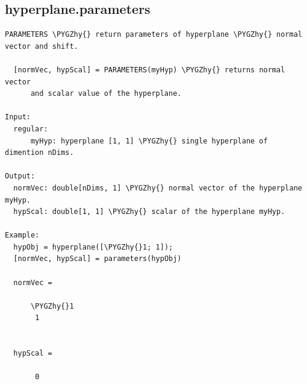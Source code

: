 \documentclass[letterpaper,10pt,english]{sphinxmanual}
\def\PYGZhy{\char`\-}
\begin{document}
\subsection{hyperplane.parameters}
\label{chap_functions:hyperplane-parameters}
\begin{Verbatim}[commandchars=\\\{\}]
PARAMETERS \PYGZhy{} return parameters of hyperplane \PYGZhy{} normal vector and shift.

  [normVec, hypScal] = PARAMETERS(myHyp) \PYGZhy{} returns normal vector
      and scalar value of the hyperplane.

Input:
  regular:
      myHyp: hyperplane [1, 1] \PYGZhy{} single hyperplane of dimention nDims.

Output:
  normVec: double[nDims, 1] \PYGZhy{} normal vector of the hyperplane myHyp.
  hypScal: double[1, 1] \PYGZhy{} scalar of the hyperplane myHyp.

Example:
  hypObj = hyperplane([\PYGZhy{}1; 1]);
  [normVec, hypScal] = parameters(hypObj)

  normVec =

      \PYGZhy{}1
       1


  hypScal =

       0
\end{Verbatim}
\end{document}
